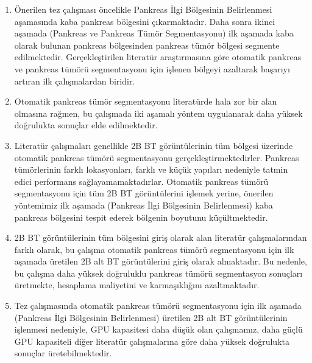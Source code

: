 \begin{enumerate}
	\item Önerilen tez çalışması öncelikle Pankreas İlgi Bölgesinin Belirlenmesi aşamasında kaba pankreas bölgesini çıkarmaktadır. Daha sonra ikinci aşamada (Pankreas ve Pankreas Tümör Segmentasyonu) ilk aşamada kaba olarak bulunan pankreas bölgesinden pankreas tümör bölgesi segmente edilmektedir. Gerçekleştirilen literatür araştırmasına göre otomatik pankreas ve pankreas tümörü segmentasyonu için işlenen bölgeyi azaltarak başarıyı artıran ilk çalışmalardan biridir. 
	
	\item Otomatik pankreas tümör segmentasyonu literatürde hala zor bir alan olmasına rağmen, bu çalışmada iki aşamalı yöntem uygulanarak daha yüksek doğrulukta sonuçlar elde edilmektedir. 
	
	\item Literatür çalışmaları genellikle 2B BT görüntülerinin tüm bölgesi üzerinde otomatik pankreas tümörü segmentasyonu gerçekleştirmektedirler. Pankreas tümörlerinin farklı lokasyonları, farklı ve küçük yapıları nedeniyle tatmin edici performans sağlayamamaktadırlar. Otomatik pankreas tümörü segmentasyonu için tüm 2B BT görüntülerini işlemek yerine, önerilen yöntemimiz ilk aşamada (Pankreas İlgi Bölgesinin Belirlenmesi) kaba pankreas bölgesini tespit ederek bölgenin boyutunu küçültmektedir. 
	
	\item 2B BT görüntülerinin tüm bölgesini giriş olarak alan literatür çalışmalarından farklı olarak, bu çalışma otomatik pankreas tümörü segmentasyonu için ilk aşamada üretilen 2B alt BT görüntülerini giriş olarak almaktadır. Bu nedenle, bu çalışma daha yüksek doğruluklu pankreas tümörü segmentasyon sonuçları üretmekte, hesaplama maliyetini ve karmaşıklığını azaltmaktadır. 
	
	\item Tez çalışmasında otomatik pankreas tümörü segmentasyonu için ilk aşamada (Pankreas İlgi Bölgesinin Belirlenmesi) üretilen 2B alt BT görüntülerinin işlenmesi nedeniyle, GPU kapasitesi daha düşük olan çalışmamız, daha güçlü GPU kapasiteli diğer literatür çalışmalarına göre daha yüksek doğrulukta sonuçlar üretebilmektedir. 
	
\end{enumerate}
